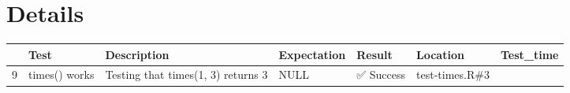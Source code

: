 \documentclass[
]{book}
\begin{document}
\hypertarget{details-1}{%
\section*{Details}\label{details-1}}

\begin{longtable}[]{@{}lllllll@{}}
\toprule
\begin{minipage}[b]{0.01\columnwidth}\raggedright
\strut
\end{minipage} & \begin{minipage}[b]{0.14\columnwidth}\raggedright
Test\strut
\end{minipage} & \begin{minipage}[b]{0.25\columnwidth}\raggedright
Description\strut
\end{minipage} & \begin{minipage}[b]{0.05\columnwidth}\raggedright
Expectation\strut
\end{minipage} & \begin{minipage}[b]{0.22\columnwidth}\raggedright
Result\strut
\end{minipage} & \begin{minipage}[b]{0.06\columnwidth}\raggedright
Location\strut
\end{minipage} & \begin{minipage}[b]{0.08\columnwidth}\raggedright
Test\_time\strut
\end{minipage}\tabularnewline
\midrule
\endhead
\begin{minipage}[t]{0.01\columnwidth}\raggedright
9\strut
\end{minipage} & \begin{minipage}[t]{0.14\columnwidth}\raggedright
times() works\strut
\end{minipage} & \begin{minipage}[t]{0.25\columnwidth}\raggedright
Testing that times(1, 3) returns 3\strut
\end{minipage} & \begin{minipage}[t]{0.05\columnwidth}\raggedright
NULL\strut
\end{minipage} & \begin{minipage}[t]{0.22\columnwidth}\raggedright
✅ Success\strut
\end{minipage} & \begin{minipage}[t]{0.06\columnwidth}\raggedright
test-times.R\#3\strut
\end{minipage} & \begin{minipage}[t]{0.08\columnwidth}\raggedright

\end{minipage}
\end{longtable}
\end{document}
